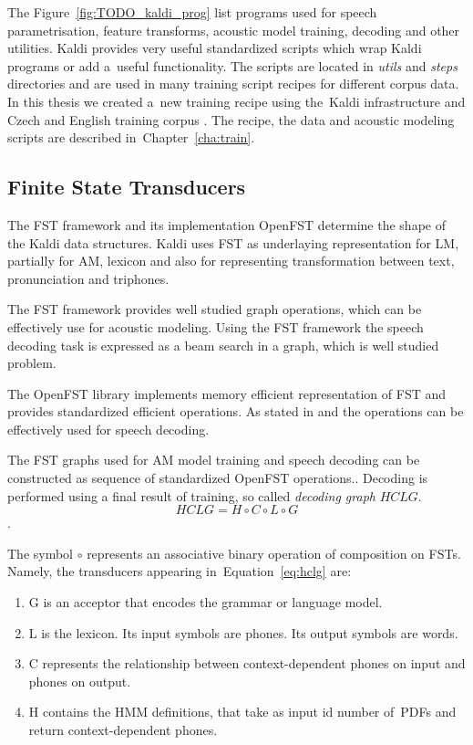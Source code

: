 The Figure~\ref{fig:TODO_kaldi_prog} list programs used 
for speech parametrisation, feature transforms, acoustic model
training, decoding and other utilities. Kaldi provides very useful standardized scripts which wrap
Kaldi programs or add a~useful functionality. The scripts are located in {\it utils} and {\it steps}
directories and are used in many training script recipes for different corpus data.
In this thesis we created a~new training recipe using the~Kaldi infrastructure and
Czech and English training corpus \cite{korvas_2014}.
The recipe, the data and acoustic modeling scripts are described in~Chapter~\ref{cha:train}.

\subsection{Finite State Transducers} 
\label{sec:fst}
The \acl{FST} framework and its implementation OpenFST  
determine the shape of the Kaldi data structures.
Kaldi uses \ac{FST} as underlaying representation for \ac{LM}, partially for \ac{AM}, lexicon and 
also for representing transformation between text, pronunciation and triphones.

The \ac{FST} framework provides well studied graph operations\cite{mohri2002weighted},
which can be effectively use for acoustic modeling.
Using the \ac{FST} framework the speech decoding task is expressed as
a beam search in a graph, which is well studied problem.

The OpenFST library implements memory efficient representation of \ac{FST} and
provides standardized efficient operations.
As stated in \cite{mohri2002weighted} and \cite{povey2011kaldi} the operations can be effectively used
for speech decoding. 

The \ac{FST} graphs used for \ac{AM} model training and speech decoding
can be constructed as sequence of standardized OpenFST operations.\cite{mohri2002weighted}.
Decoding is performed using a final result of training, so called {\it decoding graph} $HCLG$. 
\begin{equation} \label{eq:hclg}
HCLG = H\circ C\circ L\circ G
\end{equation}.

The symbol $\circ$ represents an associative binary operation of composition on \acp{FST}.
Namely, the transducers appearing in~Equation~\ref{eq:hclg} are:
\begin{enumerate}
    \item G is an acceptor that encodes the grammar or language model.
    \item L is the lexicon. Its input symbols are phones. Its output symbols are words.
    \item C represents the relationship between context-dependent phones on input and phones on output.
    \item H contains the \ac{HMM} definitions, that take as input id number of~\acp{PDF} and return context-dependent phones.
\end{enumerate}

